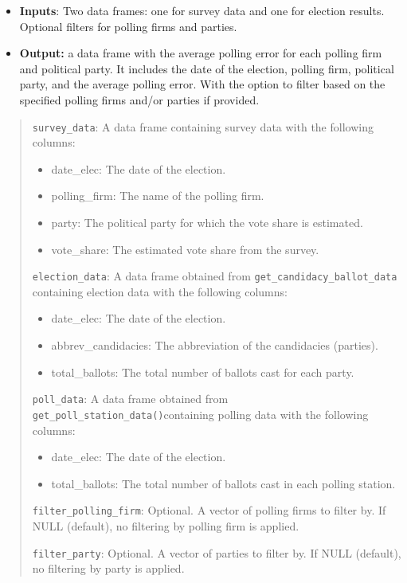 \documentclass[
  letterpaper,
  DIV=11,
  numbers=noendperiod]{scrreprt}
\providecommand{\tightlist}{%
  \setlength{\itemsep}{0pt}\setlength{\parskip}{0pt}}\usepackage{longtable,booktabs,array}
\begin{document}
\begin{itemize}
\item
  \textbf{Inputs}: Two data frames: one for survey data and one for
  election results. Optional filters for polling firms and parties.
\item
  \textbf{Output:} a data frame with the average polling error for each
  polling firm and political party. It includes the date of the
  election, polling firm, political party, and the average polling
  error. With the option to filter based on the specified polling firms
  and/or parties if provided.
\end{itemize}

\begin{quote}
\texttt{survey\_data}: A data frame containing survey data with the
following columns:

\begin{itemize}
\tightlist
\item
  date\_elec: The date of the election.
\item
  polling\_firm: The name of the polling firm.
\item
  party: The political party for which the vote share is estimated.
\item
  vote\_share: The estimated vote share from the survey.
\end{itemize}

\texttt{election\_data}: A data frame obtained from
\texttt{get\_candidacy\_ballot\_data} containing election data with the
following columns:

\begin{itemize}
\tightlist
\item
  date\_elec: The date of the election.
\item
  abbrev\_candidacies: The abbreviation of the candidacies (parties).
\item
  total\_ballots: The total number of ballots cast for each party.
\end{itemize}

\texttt{poll\_data}: A data frame obtained from
\texttt{get\_poll\_station\_data()}containing polling data with the
following columns:

\begin{itemize}
\tightlist
\item
  date\_elec: The date of the election.
\item
  total\_ballots: The total number of ballots cast in each polling
  station.
\end{itemize}

\texttt{filter\_polling\_firm}: Optional. A vector of polling firms to
filter by. If NULL (default), no filtering by polling firm is applied.

\texttt{filter\_party}: Optional. A vector of parties to filter by. If
NULL (default), no filtering by party is applied.
\end{quote}
\end{document}
